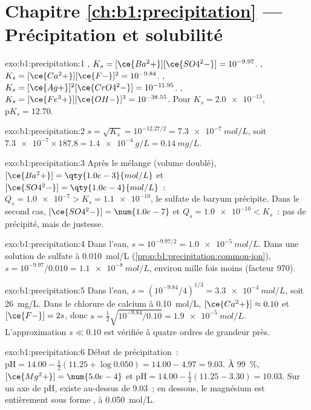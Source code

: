 \section*{Chapitre \ref{ch:b1:precipitation} --- Précipitation et solubilité}

\begin{solution}{exo:b1:precipitation:1}
, $K_s = [\ce{Ba^2+}][\ce{SO4^2-}] =
10^{-9.97}$. , $K_s = [\ce{Ca^2+}][\ce{F-}]^2 =
10^{-9.84}$. , $K_s =
[\ce{Ag+}]^2[\ce{CrO4^2-}] = 10^{-11.95}$. ,
$K_s = [\ce{Fe^3+}][\ce{OH-}]^3 = 10^{-38.55}$. Pour $K_s = \num{2.0e-13}$,
$\mathrm{p}K_s = 12.70$.
\end{solution}

\begin{solution}{exo:b1:precipitation:2}
$s = \sqrt{K_s} = 10^{-12.27/2} = \qty{7.3e-7}{mol/L}$, soit
$\num{7.3e-7} \times 187.8 = \qty{1.4e-4}{g/L} = \qty{0.14}{mg/L}$.
\end{solution}

\begin{solution}{exo:b1:precipitation:3}
Après le mélange (volume doublé), $[\ce{Ba^2+}] = \qty{1.0e-3}{mol/L}$ et
$[\ce{SO4^2-}] = \qty{1.0e-4}{mol/L}$~: $Q_s = \num{1.0e-7} > K_s =
\num{1.1e-10}$, le sulfate de baryum précipite. Dans le second cas,
$[\ce{SO4^2-}] = \num{1.0e-7}$ et $Q_s = \num{1.0e-10} < K_s$~: pas de
précipité, mais de justesse.
\end{solution}

\begin{solution}{exo:b1:precipitation:4}
Dans l'eau, $s = 10^{-9.97/2} = \qty{1.0e-5}{mol/L}$. Dans une solution
de sulfate à \qty{0.010}{mol/L} (\cref{prop:b1:precipitation:common-ion}),
$s = 10^{-9.97}/0.010 =
\qty{1.1e-8}{mol/L}$, environ mille fois moins (facteur 970).
\end{solution}

\begin{solution}{exo:b1:precipitation:5}
Dans l'eau, $s = (10^{-9.84}/4)^{1/3} = \qty{3.3e-4}{mol/L}$, soit
\qty{26}{mg/L}. Dans le chlorure de calcium à \qty{0.10}{mol/L},
$[\ce{Ca^2+}] \approx 0.10$ et $[\ce{F-}] = 2s$, donc
$s = \frac12\sqrt{10^{-9.84}/0.10} = \qty{1.9e-5}{mol/L}$.
L'approximation $s \ll 0.10$ est vérifiée à quatre ordres de grandeur
près.
\end{solution}

\begin{solution}{exo:b1:precipitation:6}
Début de précipitation~: $\mathrm{pH} = 14.00 - \frac12(11.25 + \log 0.050) = 14.00 - 4.97 =
9.03$. À \qty{99}{\percent}, $[\ce{Mg^2+}] = \num{5.0e-4}$ et
$\mathrm{pH} = 14.00 - \frac12(11.25 - 3.30) = 10.03$. Sur un axe de pH,
 existe au-dessus de 9.03~; en dessous, le magnésium est
entièrement sous forme , à \qty{0.050}{mol/L}.
\end{solution}

